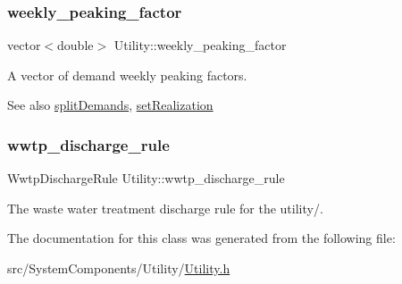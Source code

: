 \subsubsection{\texorpdfstring{weekly\+\_\+peaking\+\_\+factor}{weekly\_peaking\_factor}}
{\footnotesize\ttfamily vector$<$double$>$ Utility\+::weekly\+\_\+peaking\+\_\+factor\hspace{0.3cm}{\ttfamily [private]}}



A vector of demand weekly peaking factors. 

\begin{DoxySeeAlso}{See also}
\mbox{\hyperlink{classUtility_aca42b14087c3184d4fec10a2e8729c05}{split\+Demands}}, \mbox{\hyperlink{classUtility_a2d41989b4154aed5c2fb99a27183ca34}{set\+Realization}} 
\end{DoxySeeAlso}
\mbox{\label{classUtility_a0c598532230472e8106f6a71f97ea62d}} 
\subsubsection{\texorpdfstring{wwtp\+\_\+discharge\+\_\+rule}{wwtp\_discharge\_rule}}
{\footnotesize\ttfamily Wwtp\+Discharge\+Rule Utility\+::wwtp\+\_\+discharge\+\_\+rule\hspace{0.3cm}{\ttfamily [private]}}



The waste water treatment discharge rule for the utility/. 



The documentation for this class was generated from the following file\+:\begin{DoxyCompactItemize}
\item 
src/\+System\+Components/\+Utility/\mbox{\hyperlink{Utility_8h}{Utility.\+h}}\end{DoxyCompactItemize}
